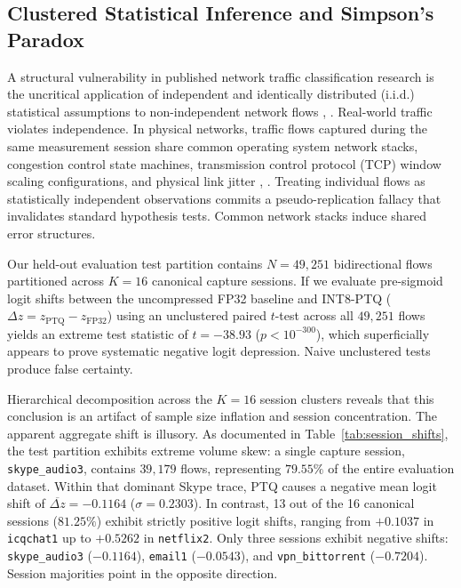 \documentclass[conference]{IEEEtran}
\begin{document}
\subsection{Clustered Statistical Inference and Simpson's Paradox}
A structural vulnerability in published network traffic classification research is the uncritical application of independent and identically distributed (i.i.d.) statistical assumptions to non-independent network flows \cite{b25}, \cite{b26}. Real-world traffic violates independence. In physical networks, traffic flows captured during the same measurement session share common operating system network stacks, congestion control state machines, transmission control protocol (TCP) window scaling configurations, and physical link jitter \cite{b1}, \cite{b24}. Treating individual flows as statistically independent observations commits a pseudo-replication fallacy that invalidates standard hypothesis tests. Common network stacks induce shared error structures.

Our held-out evaluation test partition contains $N = 49,251$ bidirectional flows partitioned across $K = 16$ canonical capture sessions. If we evaluate pre-sigmoid logit shifts between the uncompressed FP32 baseline and INT8-PTQ ($\Delta z = z_{\text{PTQ}} - z_{\text{FP32}}$) using an unclustered paired $t$-test across all $49,251$ flows yields an extreme test statistic of $t = -38.93$ ($p < 10^{-300}$), which superficially appears to prove systematic negative logit depression.
Naive unclustered tests produce false certainty.

Hierarchical decomposition across the $K = 16$ session clusters reveals that this conclusion is an artifact of sample size inflation and session concentration. The apparent aggregate shift is illusory. As documented in Table~\ref{tab:session_shifts}, the test partition exhibits extreme volume skew: a single capture session, \texttt{skype\_audio3}, contains $39,179$ flows, representing $79.55\%$ of the entire evaluation dataset. Within that dominant Skype trace, PTQ causes a negative mean logit shift of $\overline{\Delta z} = -0.1164$ ($\sigma = 0.2303$). In contrast, 13 out of the 16 canonical sessions ($81.25\%$) exhibit strictly positive logit shifts, ranging from $+0.1037$ in \texttt{icqchat1} up to $+0.5262$ in \texttt{netflix2}. Only three sessions exhibit negative shifts: \texttt{skype\_audio3} ($-0.1164$), \texttt{email1} ($-0.0543$), and \texttt{vpn\_bittorrent} ($-0.7204$). Session majorities point in the opposite direction.
\end{document}
